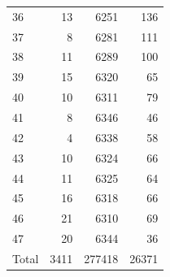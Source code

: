 \begin{table}
\begin{tabular}{lrrr}
36 & 13 & 6251 & 136 \\
37 & 8 & 6281 & 111 \\
38 & 11 & 6289 & 100 \\
39 & 15 & 6320 & 65 \\
40 & 10 & 6311 & 79 \\
41 & 8 & 6346 & 46 \\
42 & 4 & 6338 & 58 \\
43 & 10 & 6324 & 66 \\
44 & 11 & 6325 & 64 \\
45 & 16 & 6318 & 66 \\
46 & 21 & 6310 & 69 \\
47 & 20 & 6344 & 36 \\
Total & 3411 & 277418 & 26371 \\
\end{tabular}
\end{table}
